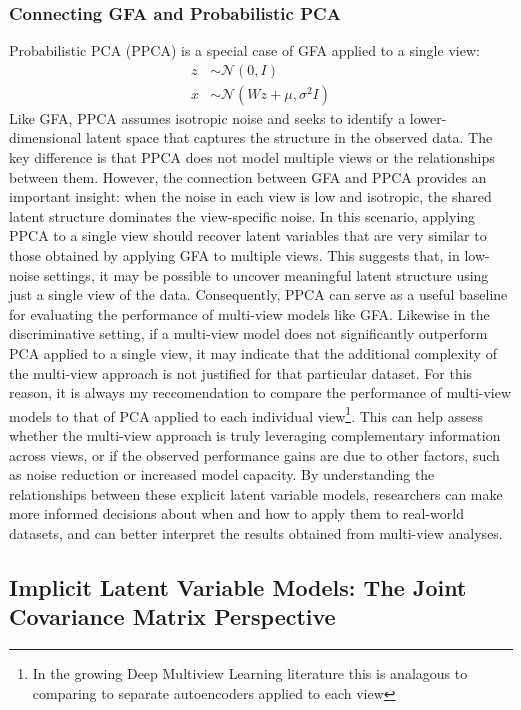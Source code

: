 \subsubsection{Connecting GFA and Probabilistic PCA}
Probabilistic PCA (PPCA) \citep{tipping1999probabilistic} is a special case of GFA applied to a single view:
\begin{align}
z &\sim \mathcal{N}(0, I)\\
x &\sim \mathcal{N}(W z + \mu, \sigma^2 I)
\end{align}
Like GFA, PPCA assumes isotropic noise and seeks to identify a lower-dimensional latent space that captures the structure in the observed data. The key difference is that PPCA does not model multiple views or the relationships between them.
However, the connection between GFA and PPCA provides an important insight: when the noise in each view is low and isotropic, the shared latent structure dominates the view-specific noise. In this scenario, applying PPCA to a single view should recover latent variables that are very similar to those obtained by applying GFA to multiple views.
This suggests that, in low-noise settings, it may be possible to uncover meaningful latent structure using just a single view of the data. Consequently, PPCA can serve as a useful baseline for evaluating the performance of multi-view models like GFA. Likewise in the discriminative setting, if a multi-view model does not significantly outperform PCA applied to a single view, it may indicate that the additional complexity of the multi-view approach is not justified for that particular dataset.
For this reason, it is always my reccomendation to compare the performance of multi-view models to that of PCA applied to each individual view\footnote{In the growing Deep Multiview Learning literature this is analagous to comparing to separate autoencoders applied to each view}. This can help assess whether the multi-view approach is truly leveraging complementary information across views, or if the observed performance gains are due to other factors, such as noise reduction or increased model capacity.
By understanding the relationships between these explicit latent variable models, researchers can make more informed decisions about when and how to apply them to real-world datasets, and can better interpret the results obtained from multi-view analyses.

\subsection{Implicit Latent Variable Models: The Joint Covariance Matrix Perspective}

